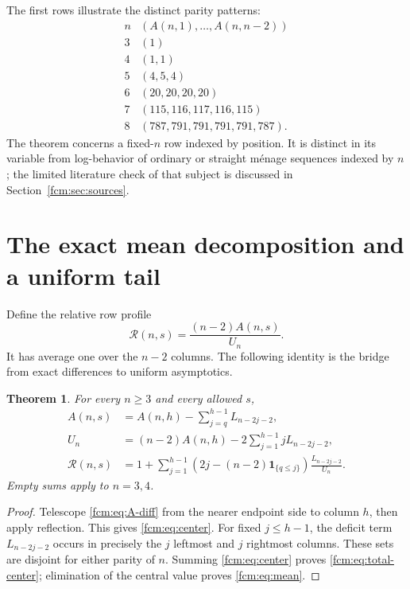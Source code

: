 \documentclass[11pt,letterpaper]{article}
\newtheorem{theorem}{Theorem}[section]
\theoremstyle{remark}\newtheorem{remark}[theorem]{Remark}
\newcommand{\ind}{\mathbf 1}
\newcommand{\RR}{\mathcal R}
\begin{document}
The first rows illustrate the distinct parity patterns:
\[
\begin{array}{c|l}
 n& (A(n,1),\ldots,A(n,n-2))\\\hline
 3&(1)\\4&(1,1)\\5&(4,5,4)\\6&(20,20,20,20)\\
 7&(115,116,117,116,115)\\8&(787,791,791,791,791,787).
\end{array}
\]
The theorem concerns a fixed-$n$ row indexed by position. It is distinct in its variable from log-behavior of ordinary or straight m\'enage sequences indexed by $n$; the limited literature check of that subject is discussed in Section~\ref{fcm:sec:sources}.

\section{The exact mean decomposition and a uniform tail}
Define the relative row profile
\begin{equation}\label{fcm:eq:relative}
 \RR(n,s)=\frac{(n-2)A(n,s)}{U_n}.
\end{equation}
It has average one over the $n-2$ columns. The following identity is the bridge from exact differences to uniform asymptotics.

\begin{theorem}\label{fcm:thm:mean}
For every $n\ge3$ and every allowed $s$,
\begin{align}\label{fcm:eq:center}
 A(n,s)&=A(n,h)-\sum_{j=q}^{h-1}L_{n-2j-2},\\
 U_n&=(n-2)A(n,h)-2\sum_{j=1}^{h-1}jL_{n-2j-2},\label{fcm:eq:total-center}\\
 \RR(n,s)&=1+\sum_{j=1}^{h-1}
 \left(2j-(n-2)\ind_{\{q\le j\}}\right)\frac{L_{n-2j-2}}{U_n}.\label{fcm:eq:mean}
\end{align}
Empty sums apply to $n=3,4$.
\end{theorem}
\begin{proof}
Telescope \eqref{fcm:eq:A-diff} from the nearer endpoint side to column $h$, then apply reflection. This gives \eqref{fcm:eq:center}. For fixed $j\le h-1$, the deficit term $L_{n-2j-2}$ occurs in precisely the $j$ leftmost and $j$ rightmost columns. These sets are disjoint for either parity of $n$. Summing \eqref{fcm:eq:center} proves \eqref{fcm:eq:total-center}; elimination of the central value proves \eqref{fcm:eq:mean}.
\end{proof}
\end{document}
